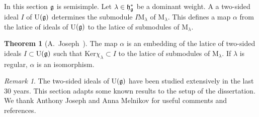\documentclass[12pt]{amsart}
\theoremstyle{definition}\newtheorem{theorem}{Theorem}[section]
\theoremstyle{definition}\newtheorem{definition}[proposition]{Definition}
\theoremstyle{remark}\newtheorem{example}[proposition]{Example}
\newtheorem{remark}[proposition]{Remark}
\begin{document}
In this section $\frak g$ is semisimple. Let $\lambda\in\frak h_\frak g^*$ be a dominant weight. A a two-sided ideal $I$ of U$(\frak g)$ determines the submodule $I$M$_\lambda$ of M$_\lambda$. This defines a map $\alpha$ from the latice of ideals of U$(\frak g)$ to the latice of submodules of M$_\lambda$.
\begin{theorem}[A.~Joseph{~\cite[Prop.~4.3]{Jo2}}] The map $\alpha$ is an embedding of the latice of two-sided ideals $I\subset$U$(\frak g)$ such
that Ker$\chi_\lambda\subset I$ to the latice of submodules of M$_\lambda$. If $\lambda$ is regular, $\alpha$ is an isomorphism.\end{theorem}
\begin{remark}The two-sided ideals of U$(\frak g)$ have been studied extensively in the last 30 years. This section adapts some known results to the setup of the dissertation. We thank Anthony Joseph and Anna Melnikov for useful comments and references.\end{remark}
\end{document}
